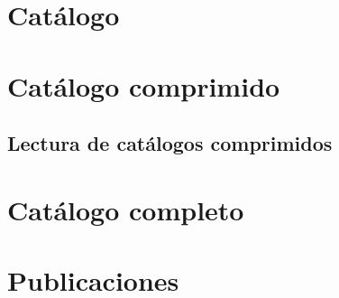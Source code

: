 \section{Catálogo}
\label{sec:catalogos:catalogo}










\section{Catálogo comprimido}
\label{sec:catalogos:catalogo-comprimido}







\subsection{Lectura de catálogos comprimidos}
\label{sec:catalogos:catalogo-comprimido:lectura}









\section{Catálogo completo}
\label{sec:catalogos:catalogo-completo}







\section{Publicaciones}
\label{sec:catalogos:publicaciones}







